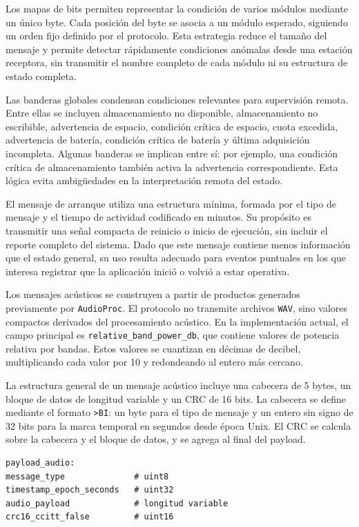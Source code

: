 Los mapas de bits permiten representar la condición de varios módulos mediante un único byte. Cada posición del byte se asocia a un módulo esperado, siguiendo un orden fijo definido por el protocolo. Esta estrategia reduce el tamaño del mensaje y permite detectar rápidamente condiciones anómalas desde una estación receptora, sin transmitir el nombre completo de cada módulo ni su estructura de estado completa.

Las banderas globales condensan condiciones relevantes para supervisión remota. Entre ellas se incluyen almacenamiento no disponible, almacenamiento no escribible, advertencia de espacio, condición crítica de espacio, cuota excedida, advertencia de batería, condición crítica de batería y última adquisición incompleta. Algunas banderas se implican entre sí: por ejemplo, una condición crítica de almacenamiento también activa la advertencia correspondiente. Esta lógica evita ambigüedades en la interpretación remota del estado.

El mensaje de arranque utiliza una estructura mínima, formada por el tipo de mensaje y el tiempo de actividad codificado en minutos. Su propósito es transmitir una señal compacta de reinicio o inicio de ejecución, sin incluir el reporte completo del sistema. Dado que este mensaje contiene menos información que el estado general, su uso resulta adecuado para eventos puntuales en los que interesa registrar que la aplicación inició o volvió a estar operativa.

Los mensajes acústicos se construyen a partir de productos generados previamente por \texttt{AudioProc}. El protocolo no transmite archivos \texttt{WAV}, sino valores compactos derivados del procesamiento acústico. En la implementación actual, el campo principal es \texttt{relative\_band\_power\_db}, que contiene valores de potencia relativa por bandas. Estos valores se cuantizan en décimas de decibel, multiplicando cada valor por 10 y redondeando al entero más cercano.

La estructura general de un mensaje acústico incluye una cabecera de 5 bytes, un bloque de datos de longitud variable y un CRC de 16 bits. La cabecera se define mediante el formato \texttt{>BI}: un byte para el tipo de mensaje y un entero sin signo de 32 bits para la marca temporal en segundos desde época Unix. El CRC se calcula sobre la cabecera y el bloque de datos, y se agrega al final del payload.

\begin{lstlisting}[style=pseudocodigo, caption={Estructura general de un payload acústico para telemetría.}, label={lst:payload_acustico_iridium}]
payload_audio:
message_type              # uint8
timestamp_epoch_seconds   # uint32
audio_payload             # longitud variable
crc16_ccitt_false         # uint16
\end{lstlisting}

